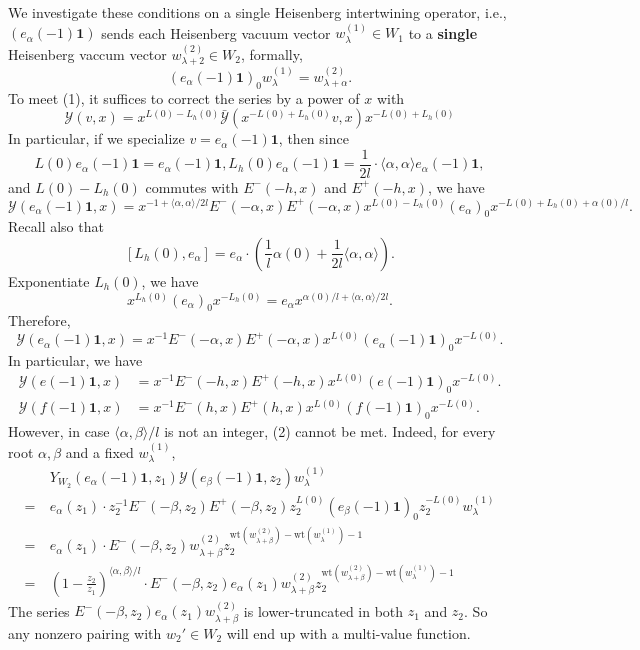 \documentclass{article}
\theoremstyle{definition}
\newcommand{\Y}{{\mathcal Y}}
\newcommand{\one}{\mathbf{1}}
\begin{document}
We investigate these conditions on a single Heisenberg intertwining operator, i.e., $(e_\alpha(-1)\one)$ sends each Heisenberg vacuum vector  $w_\lambda^{(1)} \in W_1$ to a \textbf{single} Heisenberg vaccum vector $w_{\lambda+2}^{(2)}\in W_2$, formally, 
$$(e_\alpha(-1)\one)_0 w_\lambda^{(1)} = w_{\lambda+\alpha}^{(2)}.$$
To meet (1), it suffices to correct the series by a power of $x$ with
$$\Y(v, x) = x^{L(0)-L_h(0)} \bar\Y(x^{-L(0)+L_h(0)}v, x)x^{-L(0)+L_h(0)}$$
In particular, if we specialize $v=e_\alpha(-1)\one$, then since $$L(0)e_\alpha(-1)\one = e_\alpha(-1)\one, L_h(0)e_\alpha(-1)\one = \frac 1 {2l}\cdot \langle \alpha, \alpha\rangle e_\alpha(-1)\one, $$
and $L(0)-L_h(0)$ commutes with $E^-(-h, x)$ and $E^+(-h,x)$, we have
$$\Y(e_\alpha(-1)\one, x) = x^{-1+\langle\alpha,\alpha\rangle/2l} E^-(-\alpha,x)E^+(-\alpha,x)x^{L(0)-L_h(0)}(e_\alpha)_0 x^{-L(0)+L_h(0)+\alpha(0)/l}. $$
Recall also that 
$$[L_h(0), e_\alpha]=e_\alpha \cdot \left(\frac 1 l \alpha(0)+\frac 1 {2l} \langle \alpha, \alpha\rangle \right).$$
Exponentiate $L_h(0)$, we have
$$x^{L_h(0)}(e_\alpha)_0 x^{-L_h(0)} = e_\alpha x^{\alpha(0)/l + \langle \alpha, \alpha\rangle / 2l}.$$
Therefore, 
$$\Y(e_\alpha(-1)\one, x) = x^{-1} E^-(-\alpha,x)E^+(-\alpha,x)x^{L(0)}(e_\alpha(-1)\one)_0 x^{-L(0)}. $$
In particular, we have
\begin{align*}
    \Y(e(-1)\one, x) &= x^{-1} E^-(-h,x)E^+(-h,x)x^{L(0)}(e(-1)\one)_0 x^{-L(0)}. \\
    \Y(f(-1)\one, x) & = x^{-1} E^-(h,x)E^+(h,x)x^{L(0)}(f(-1)\one)_0 x^{-L(0)}. 
\end{align*}
However, in case $\langle \alpha, \beta\rangle/l$ is not an integer, (2) cannot be met. Indeed, for every root $\alpha, \beta$ and a fixed $w_{\lambda}^{(1)}$,
\begin{align*}
    & Y_{W_2}(e_\alpha(-1)\one, z_1) \Y(e_\beta(-1)\one, z_2)w_\lambda^{(1)} \\
    = \ & e_\alpha(z_1) \cdot z_2^{-1} E^-(-\beta, z_2) E^+(-\beta, z_2) z_2^{L(0)}(e_\beta(-1)\one)_0 z_2^{-L(0)} w_\lambda^{(1)}\\
    = \ & e_\alpha(z_1) \cdot E^-(-\beta, z_2) w_{\lambda+\beta}^{(2)} z_2^{\text{wt}(w_{\lambda+\beta}^{(2)}) - \text{wt}(w_\lambda^{(1)})-1} \\
    = \ &  \left(1-\frac {z_2}{z_1}\right)^{\langle\alpha, \beta\rangle / l}\cdot E^-(-\beta, z_2) e_\alpha(z_1)w_{\lambda+\beta}^{(2)} z_2^{\text{wt}(w_{\lambda+\beta}^{(2)}) - \text{wt}(w_\lambda^{(1)})-1} 
\end{align*}
The series $E^-(-\beta, z_2) e_\alpha(z_1)w_{\lambda+\beta}^{(2)}$ is lower-truncated in both $z_1$ and $z_2$. So any nonzero pairing with $w_2' \in W_2$ will end up with a multi-value function. 
\end{document}
